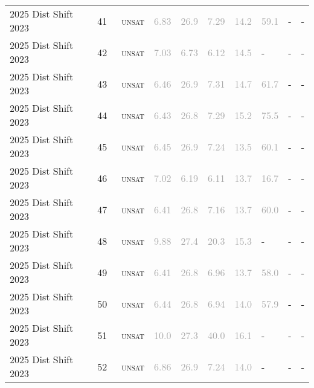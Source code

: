 \begin{center}
{\begin{longtable}{@{}llllllllll@{}}
2025 Dist Shift 2023 & 41 & ~\textsc{unsat} & \textcolor{darkgray}{6.83} & \textcolor{darkgray}{26.9} & \textcolor{darkgray}{7.29} & \textcolor{darkgray}{14.2} & \textcolor{darkgray}{59.1} & - & - \\
2025 Dist Shift 2023 & 42 & ~\textsc{unsat} & \textcolor{darkgray}{7.03} & \textcolor{darkgray}{6.73} & \textcolor{darkgray}{6.12} & \textcolor{darkgray}{14.5} & - & - & - \\
2025 Dist Shift 2023 & 43 & ~\textsc{unsat} & \textcolor{darkgray}{6.46} & \textcolor{darkgray}{26.9} & \textcolor{darkgray}{7.31} & \textcolor{darkgray}{14.7} & \textcolor{darkgray}{61.7} & - & - \\
2025 Dist Shift 2023 & 44 & ~\textsc{unsat} & \textcolor{darkgray}{6.43} & \textcolor{darkgray}{26.8} & \textcolor{darkgray}{7.29} & \textcolor{darkgray}{15.2} & \textcolor{darkgray}{75.5} & - & - \\
2025 Dist Shift 2023 & 45 & ~\textsc{unsat} & \textcolor{darkgray}{6.45} & \textcolor{darkgray}{26.9} & \textcolor{darkgray}{7.24} & \textcolor{darkgray}{13.5} & \textcolor{darkgray}{60.1} & - & - \\
2025 Dist Shift 2023 & 46 & ~\textsc{unsat} & \textcolor{darkgray}{7.02} & \textcolor{darkgray}{6.19} & \textcolor{darkgray}{6.11} & \textcolor{darkgray}{13.7} & \textcolor{darkgray}{16.7} & - & - \\
2025 Dist Shift 2023 & 47 & ~\textsc{unsat} & \textcolor{darkgray}{6.41} & \textcolor{darkgray}{26.8} & \textcolor{darkgray}{7.16} & \textcolor{darkgray}{13.7} & \textcolor{darkgray}{60.0} & - & - \\
2025 Dist Shift 2023 & 48 & ~\textsc{unsat} & \textcolor{darkgray}{9.88} & \textcolor{darkgray}{27.4} & \textcolor{darkgray}{20.3} & \textcolor{darkgray}{15.3} & - & - & - \\
2025 Dist Shift 2023 & 49 & ~\textsc{unsat} & \textcolor{darkgray}{6.41} & \textcolor{darkgray}{26.8} & \textcolor{darkgray}{6.96} & \textcolor{darkgray}{13.7} & \textcolor{darkgray}{58.0} & - & - \\
2025 Dist Shift 2023 & 50 & ~\textsc{unsat} & \textcolor{darkgray}{6.44} & \textcolor{darkgray}{26.8} & \textcolor{darkgray}{6.94} & \textcolor{darkgray}{14.0} & \textcolor{darkgray}{57.9} & - & - \\
2025 Dist Shift 2023 & 51 & ~\textsc{unsat} & \textcolor{darkgray}{10.0} & \textcolor{darkgray}{27.3} & \textcolor{darkgray}{40.0} & \textcolor{darkgray}{16.1} & - & - & - \\
2025 Dist Shift 2023 & 52 & ~\textsc{unsat} & \textcolor{darkgray}{6.86} & \textcolor{darkgray}{26.9} & \textcolor{darkgray}{7.24} & \textcolor{darkgray}{14.0} & - & - & - \\

\end{longtable}}
\end{center}
